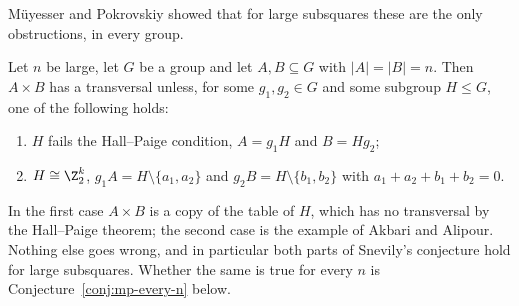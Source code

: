 
M\"uyesser and Pokrovskiy showed that for large subsquares these are the only obstructions, in every group.

\begin{theorem}\label{thm:subsquares}
Let $n$ be large, let $G$ be a group and let $A,B\subseteq G$ with $|A|=|B|=n$. Then $A\times B$ has a transversal unless, for some $g_1,g_2\in G$ and some subgroup $H\leq G$, one of the following holds:
\begin{enumerate}
\item $H$ fails the Hall--Paige condition, $A=g_1H$ and $B=Hg_2$;
\item $H\cong\Z_2^k$, $g_1A=H\setminus\{a_1,a_2\}$ and $g_2B=H\setminus\{b_1,b_2\}$ with $a_1+a_2+b_1+b_2=0$.
\end{enumerate}
\end{theorem}

In the first case $A\times B$ is a copy of the table of $H$, which has no transversal by the Hall--Paige theorem; the second case is the example of Akbari and Alipour. Nothing else goes wrong, and in particular both parts of Snevily's conjecture hold for large subsquares. Whether the same is true for every $n$ is Conjecture~\ref{conj:mp-every-n} below.

